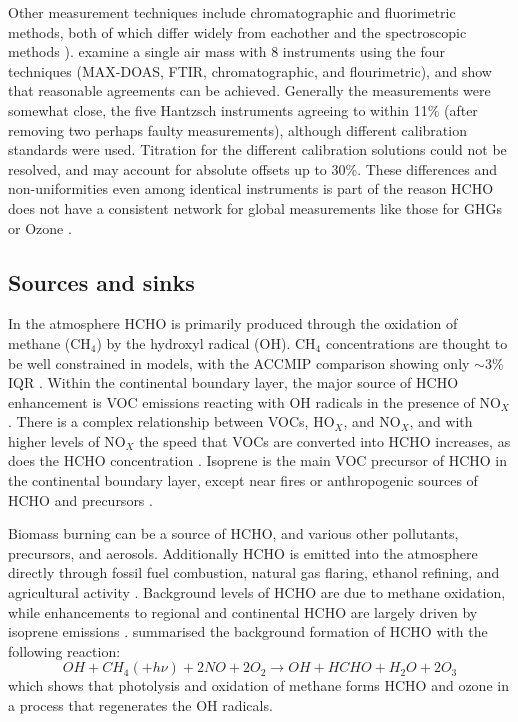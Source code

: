     Other measurement techniques include chromatographic and fluorimetric methods, both of which differ widely from eachother and the spectroscopic methods \citep{Hak2005}).
    \cite{Hak2005} examine a single air mass with 8 instruments using the four techniques (MAX-DOAS, FTIR, chromatographic, and flourimetric), and show that reasonable agreements can be achieved.
    Generally the measurements were somewhat close, the five Hantzsch instruments agreeing to within 11\% (after removing two perhaps faulty measurements), although different calibration standards were used.
    Titration for the different calibration solutions could not be resolved, and may account for absolute offsets up to 30\%.
    These differences and non-uniformities even among identical instruments is part of the reason HCHO does not have a consistent network for global measurements like those for GHGs or Ozone \citep{FortemsCheiney2012}.
  
  \subsection{Sources and sinks}
    
    In the atmosphere HCHO is primarily produced through the oxidation of methane (CH$_4$) by the hydroxyl radical (OH).
    CH$_4$ concentrations are thought to be well constrained in models, with the ACCMIP comparison showing only $\sim3$\% IQR \citep{Young2013}.
    Within the continental boundary layer, the major source of HCHO enhancement is VOC emissions reacting with OH radicals in the presence of NO$_X$ \citep{Wagner2002, Millet2006, Kefauver2014}.
    There is a complex relationship between VOCs, HO$_X$, and NO$_X$, and with higher levels of NO$_X$ the speed that VOCs are converted into HCHO increases, as does the HCHO concentration \citep{Wolfe2016}.
    Isoprene is the main VOC precursor of HCHO in the continental boundary layer, except near fires or anthropogenic sources of HCHO and precursors \citep{Guenther1995, Kefauver2014, Wolfe2016}.
    
    Biomass burning can be a source of HCHO, and various other pollutants, precursors, and aerosols.
    Additionally HCHO is emitted into the atmosphere directly through fossil fuel combustion, natural gas flaring, ethanol refining, and agricultural activity \citep{Wolfe2016}.
    Background levels of HCHO are due to methane oxidation, while enhancements to regional and continental HCHO are largely driven by isoprene emissions \citep{Guenther1995, Palmer2003, Shim2005, Kefauver2014}.
    \citet{Atkinson2000} summarised the background formation of HCHO with the following reaction:
    \begin{equation} \label{ch_LitRev:eqn:MethaneBackground}
    OH + CH_4 (+ h\nu) + 2NO + 2O_2 \rightarrow OH + HCHO + H_2O + 2O_3
    \end{equation}
    which shows that photolysis and oxidation of methane forms HCHO and ozone in a process that regenerates the OH radicals.
    
